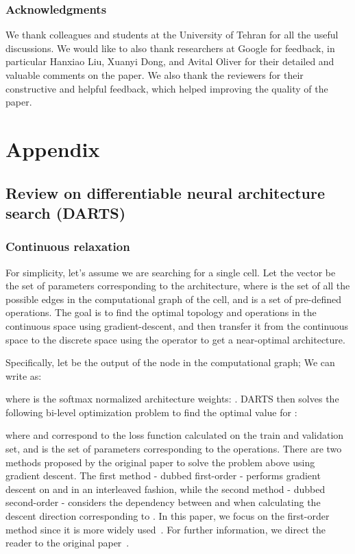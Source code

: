\documentclass{article} \usepackage{fancyhdr, iclr2023_conference, times}
\begin{document}
\subsubsection*{Acknowledgments}
We thank colleagues and students at the University of Tehran for all the useful discussions. We would like to also thank researchers at Google for feedback, in particular Hanxiao Liu, Xuanyi Dong, and Avital Oliver for their detailed and valuable comments on the paper. We also thank the reviewers for their constructive and helpful feedback, which helped improving the quality of the paper.




\appendix
\section{Appendix}
\subsection{Review on differentiable neural architecture search (DARTS)}
\label{appndx:DARTS}
\subsubsection{Continuous relaxation}
\par For simplicity, let's assume we are searching for a single cell. Let the vector  be the set of parameters corresponding to the architecture, where  is the set of all the possible edges in the computational graph of the cell, and  is a set of pre-defined operations. The goal is to find the optimal topology and operations in the continuous space using gradient-descent, and then transfer it from the continuous space to the discrete space using the  operator to get a near-optimal architecture. 
\par Specifically, let  be the output of the  node in the computational graph; We can write  as:

where  is the softmax normalized architecture weights: . DARTS then solves the following bi-level optimization problem to find the optimal value for :

where  and  correspond to the loss function calculated on the train and validation set, and  is the set of parameters corresponding to the operations. There are two methods proposed by the original paper to solve the problem above using gradient descent. The first method - dubbed first-order - performs gradient descent on  and  in an interleaved fashion, while the second method - dubbed second-order - considers the dependency between  and  when calculating the descent direction corresponding to . In this paper, we focus on the first-order method since it is more widely used~\citep{DBLP:journals/jmlr/ElskenMH19}. For further information, we direct the reader to the original paper~\citep{DBLP:conf/iclr/LiuSY19}.
\end{document}

